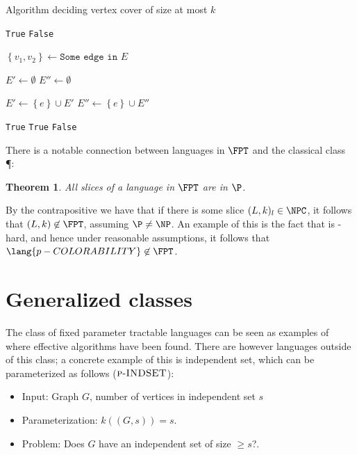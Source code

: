 \documentclass[a4paper,11pt]{report}
\theoremstyle{plain}
\newtheorem{thm}{Theorem}[chapter] %
\theoremstyle{definition}
\begin{document}
\begin{algorithm}
\begin{algorithmic}
\caption{Algorithm deciding vertex cover of size at most $k$}
\label{fpt-vertex-cover}
    \Return \texttt{True}
    \Return \texttt{False}
\EndIf

\State $\left\{v_1, v_2\right\} \gets \texttt{Some edge in } E$

\State $E'\gets \emptyset$
\State $E''\gets \emptyset$

      \State $E'\gets \left\{e\right\}\cup E'$
  \EndIf
      \State $E''\gets \left\{e\right\}\cup E''$
  \EndIf
\EndFor

    \Return \texttt{True}
    \Return \texttt{True}
\Else {}
    \Return \texttt{False}
\EndIf

\EndProcedure
\end{algorithmic}
\end{algorithm}

There is a notable connection between languages in $\FPT$ and the classical class \P \cite{FG06}:

\begin{thm}
All slices of a language in $\FPT$ are in $\P$.
\end{thm}

By the contrapositive we have that if there is some slice $(L, k)_{l} \in \NPC$, it follows that $(L, k) \not \in \FPT$, assuming $\P \not = \NP$.
An example of this is the fact that  is \NP-hard, and hence under reasonable assumptions, it follows that $\lang{p-COLORABILITY} \not \in \FPT$.

\section{Generalized classes}
The class of fixed parameter tractable languages can be seen as examples of where effective algorithms have been found.
There are however languages outside of this class; a concrete example of this is independent set, which can be parameterized as follows ($\textsc{p-INDSET}$):

\begin{itemize}
\item Input: Graph $G$, number of vertices in independent set $s$
\item Parameterization: $k((G, s)) = s$.
\item Problem: Does $G$ have an independent set of size $\ge s$?.
\end{itemize}
\end{document}
